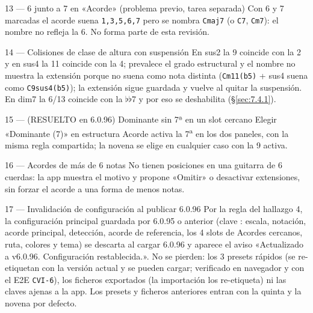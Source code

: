 \documentclass[a4paper,11pt,oneside]{report}
\newcommand{\Sref}[1]{\S\ref{#1}}
\newcommand{\flt}{\ensuremath{\flat}}
\begin{document}
\begin{hallazgobox}{13 --- 6 junto a 7 en «Acorde» (problema previo, tarea separada)}
Con 6 y 7 marcadas el acorde suena \lstinline!1,3,5,6,7! pero se nombra \lstinline!Cmaj7! (o \lstinline!C7!, \lstinline!Cm7!): el nombre no refleja la 6. No forma parte de esta revisión.
\end{hallazgobox}

\begin{hallazgobox}{14 --- Colisiones de clase de altura con suspensión}
En sus2 la 9 coincide con la 2 y en sus4 la 11 coincide con la 4; prevalece el grado estructural y el nombre no muestra la extensión porque no suena como nota distinta (\lstinline!Cm11(b5)! + sus4 suena como \lstinline!C9sus4(b5)!); la extensión sigue guardada y vuelve al quitar la suspensión. En dim7 la 6/13 coincide con la \flt\flt7 y por eso se deshabilita (\Sref{sec:7.4.1}).
\end{hallazgobox}

\begin{hallazgobox}{15 --- (RESUELTO en 6.0.96) Dominante sin 7ª en un slot cercano}
Elegir «Dominante (7)» en estructura Acorde activa la 7\textsuperscript{a} en los dos paneles, con la misma regla compartida; la novena se elige en cualquier caso con la 9 activa.
\end{hallazgobox}

\begin{hallazgobox}{16 --- Acordes de más de 6 notas}
No tienen posiciones en una guitarra de 6 cuerdas: la app muestra el motivo y propone «Omitir» o desactivar extensiones, sin forzar el acorde a una forma de menos notas.
\end{hallazgobox}

\begin{hallazgobox}{17 --- Invalidación de configuración al publicar 6.0.96}
Por la regla del hallazgo 4, la configuración principal guardada por 6.0.95 o anterior (clave \texttt{}: escala, notación, acorde principal, detección, acorde de referencia, los 4 slots de Acordes cercanos, ruta, colores y tema) se descarta al cargar 6.0.96 y aparece el aviso «Actualizado a v6.0.96. Configuración restablecida.». No se pierden: los 3 presets rápidos (se re-etiquetan con la versión actual y se pueden cargar; verificado en navegador y con el E2E \lstinline!CVI-6!), los ficheros exportados (la importación los re-etiqueta) ni las claves ajenas a la app. Los presets y ficheros anteriores entran con la quinta y la novena por defecto.
\end{hallazgobox}
\end{document}
